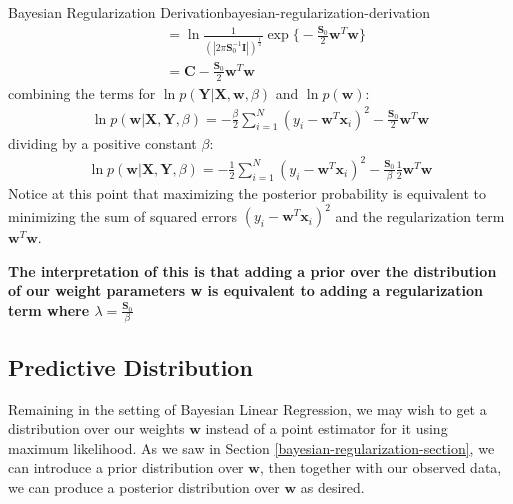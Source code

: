 \begin{derivation}{Bayesian Regularization Derivation}{bayesian-regularization-derivation}
\begin{align*}
        &= \ln{\frac{1}{(|2\pi\boldsymbol{S}_{0}^{-1}\textbf{I}|)^{\frac{1}{2}}} \exp{\bigg\{-\frac{\boldsymbol{S}_{0}}{2} \textbf{w}^{T}\textbf{w}\bigg\}}} \\
        &= \textbf{C} -\frac{\boldsymbol{S}_{0}}{2} \textbf{w}^{T}\textbf{w}
    \end{align*}
    combining the terms for $\ln{p(\textbf{Y}| \textbf{X}, \textbf{w}, \beta)}$ and $\ln{p(\textbf{w})}$:
    \begin{align*}
        \ln{p(\textbf{w}|\textbf{X},\textbf{Y}, \beta)} = -\frac{\beta}{2}\sum_{i=1}^{N} (y_{i} - \textbf{w}^{T} \textbf{x}_{i})^2 - \frac{\boldsymbol{S}_{0}}{2} \textbf{w}^{T}\textbf{w}
    \end{align*}
    dividing by a positive constant $\beta$:
    \begin{align*}
        \ln{p(\textbf{w}|\textbf{X},\textbf{Y}, \beta)} = -\frac{1}{2}\sum_{i=1}^{N} (y_{i} - \textbf{w}^{T} \textbf{x}_{i})^2 - \frac{\boldsymbol{S}_{0}}{\beta}\frac{1}{2} \textbf{w}^{T}\textbf{w}
    \end{align*}
    Notice at this point that maximizing the posterior probability is equivalent to minimizing the sum of squared errors $(y_{i} - \textbf{w}^{T} \textbf{x}_{i})^2$ and the regularization term $\textbf{w}^{T}\textbf{w}$.
\end{derivation}

\textbf{The interpretation of this is that adding a prior over the distribution of our weight parameters \textbf{w} is equivalent to adding a regularization term where $\lambda = \frac{\boldsymbol{S}_{0}}{\beta}$}

\subsection{Predictive Distribution}
Remaining in the setting of Bayesian Linear Regression, we may wish to get a distribution over our weights $\textbf{w}$ instead of a point estimator for it using maximum likelihood. As we saw in Section \ref{bayesian-regularization-section}, we can introduce a prior distribution over $\textbf{w}$, then together with our observed data, we can produce a posterior distribution over $\textbf{w}$ as desired.

